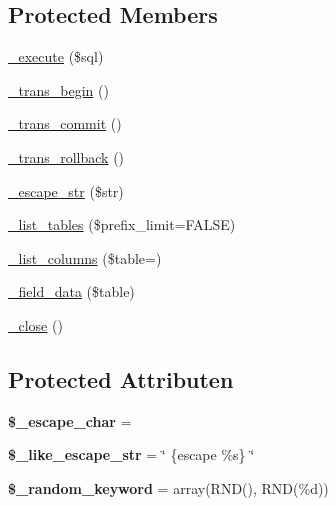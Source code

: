 \subsection*{Protected Members}
\begin{DoxyCompactItemize}
\item 
\mbox{\hyperlink{class_c_i___d_b__odbc__driver_a114ab675d89bf8324a41785fb475e86d}{\+\_\+execute}} (\$sql)
\item 
\mbox{\hyperlink{class_c_i___d_b__odbc__driver_ac81ac882c1d54347d810199a15856aac}{\+\_\+trans\+\_\+begin}} ()
\item 
\mbox{\hyperlink{class_c_i___d_b__odbc__driver_a6fe7f373e0b11cfae23a5f41c0b35dda}{\+\_\+trans\+\_\+commit}} ()
\item 
\mbox{\hyperlink{class_c_i___d_b__odbc__driver_ad49a116b0776c26b53114c9093fd102a}{\+\_\+trans\+\_\+rollback}} ()
\item 
\mbox{\hyperlink{class_c_i___d_b__odbc__driver_af8ef0237bfcdb19215b63fff769e7a55}{\+\_\+escape\+\_\+str}} (\$str)
\item 
\mbox{\hyperlink{class_c_i___d_b__odbc__driver_a435c0f3ce54fe7daa178baa8532ebd54}{\+\_\+list\+\_\+tables}} (\$prefix\+\_\+limit=F\+A\+L\+SE)
\item 
\mbox{\hyperlink{class_c_i___d_b__odbc__driver_a7ccb7f9c301fe7f0a9db701254142b63}{\+\_\+list\+\_\+columns}} (\$table=\textquotesingle{}\textquotesingle{})
\item 
\mbox{\hyperlink{class_c_i___d_b__odbc__driver_a95247d9671893adc3444cb184ad32ea1}{\+\_\+field\+\_\+data}} (\$table)
\item 
\mbox{\hyperlink{class_c_i___d_b__odbc__driver_a4d9082658000e5ede8312067c6dda9db}{\+\_\+close}} ()
\end{DoxyCompactItemize}
\subsection*{Protected Attributen}
\begin{DoxyCompactItemize}
\item 
\mbox{\label{class_c_i___d_b__odbc__driver_aaec2fb0112850159063a8e47ad3aed6e}} 
{\bfseries \$\+\_\+escape\+\_\+char} = \textquotesingle{}\textquotesingle{}
\item 
\mbox{\label{class_c_i___d_b__odbc__driver_adf86ecadf3d0e1ce3f5e0eaeeb3867ae}} 
{\bfseries \$\+\_\+like\+\_\+escape\+\_\+str} = \char`\"{} \{escape \textquotesingle{}\%s\textquotesingle{}\} \char`\"{}
\item 
\mbox{\label{class_c_i___d_b__odbc__driver_a10213aa6e05f6d924d3277bb1d2fea00}} 
{\bfseries \$\+\_\+random\+\_\+keyword} = array(\textquotesingle{}R\+ND()\textquotesingle{}, \textquotesingle{}R\+ND(\%d)\textquotesingle{})
\end{DoxyCompactItemize}


